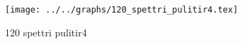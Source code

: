 \begin{figure}[h] \centering\texttt{[image: ../../graphs/120\_spettri\_pulitir4.tex]}\caption{120 spettri pulitir4}\label{gr:120_spettri_pulitir4} \end{figure}
